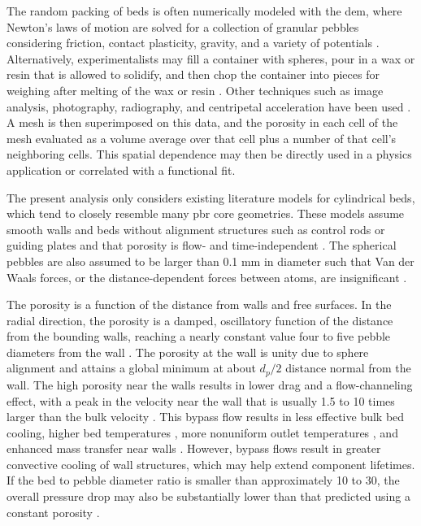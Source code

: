The random packing of beds is often numerically modeled with the \gls{dem}, where Newton's laws of motion are solved for a collection of granular pebbles considering friction, contact plasticity, gravity, and a variety of potentials \cite{duToit2008,auwerda2013,rycroft,abdalla,suikkanen,y_li,auwerda_2011,zhang2016}. Alternatively, experimentalists may fill a container with spheres, pour in a wax or resin that is allowed to solidify, and then chop the container into pieces for weighing after melting of the wax or resin \cite{goodling,benenati,roblee}. Other techniques such as image analysis, photography, radiography, and centripetal acceleration have been used \cite{goodling1985,mueller,giese}. A mesh is then superimposed on this data, and the porosity in each cell of the mesh evaluated as a volume average over that cell plus a number of that cell's neighboring cells. This spatial dependence may then be directly used in a physics application or correlated with a functional fit. 

The present analysis only considers existing literature models for cylindrical beds, which tend to closely resemble many \gls{pbr} core geometries. These models assume smooth walls and beds without alignment structures such as control rods or guiding plates \cite{bai,rycroft} and that porosity is flow- and time-independent \cite{y_li,li}. The spherical pebbles are also assumed to be larger than 0.1 \si{\milli\meter} in diameter such that Van der Waals forces, or the distance-dependent forces between atoms, are insignificant \cite{yang2000}.

The porosity is a function of the distance from walls and free surfaces. In the radial direction, the porosity is a damped, oscillatory function of the distance from the bounding walls, reaching a nearly constant value four to five pebble diameters from the wall \cite{auwerda2013,benenati,cohen,klerk,duToit2008,giese,goodling,roblee,mueller}. The porosity at the wall is unity due to sphere alignment and attains a global minimum at about \(d_p/2\) distance normal from the wall. The high porosity near the walls results in lower drag and a flow-channeling effect, with a peak in the velocity near the wall that is usually 1.5 to 10 times larger than the bulk velocity \cite{vortmeyer,amiri,y_li,amini,martin,lerou,white,cohen,giese,zhang2016}. This bypass flow results in less effective bulk bed cooling, higher bed temperatures \cite{auwerda_2011,becker}, more nonuniform outlet temperatures \cite{zhao}, and enhanced mass transfer near walls \cite{zhang2016}. However, bypass flows result in greater convective cooling of wall structures, which may help extend component lifetimes. If the bed to pebble diameter ratio is smaller than approximately 10 to 30, the overall pressure drop may also be substantially lower than that predicted using a constant porosity \cite{auwerda_2011,cohen}.

